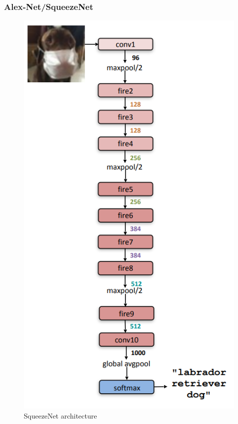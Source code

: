 \documentclass{beamer}
\begin{document}
\begin{frame}\frametitle{Alex-Net/SqueezeNet}
\begin{figure}[h]
	\includegraphics[scale=0.3]{figures/squeezenet}
	\centering
	\caption{SqueezeNet architecture}
	\label{fig:squeezenet_arch}
\end{figure}
\end{frame}
\end{document}
